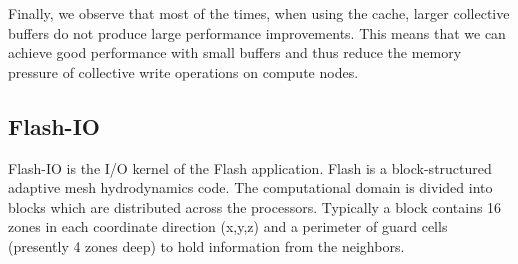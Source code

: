 Finally, we observe that most of the times, when using the cache, larger collective buffers do not produce large performance improvements. This means that we can achieve good performance with small buffers and thus reduce the memory pressure of collective 
write operations on compute nodes.

\subsection{Flash-IO}
\label{subsec: flash}
Flash-IO is the I/O kernel of the Flash application. Flash is a block-structured adaptive mesh hydrodynamics code. The computational domain is divided into blocks which are distributed across the processors. Typically a block contains 16 zones in each 
coordinate direction (x,y,z) and a perimeter of guard cells (presently 4 zones deep) to hold information from the neighbors. 
